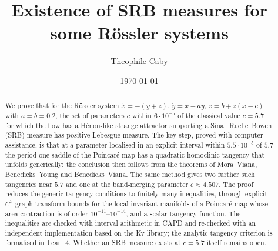 \documentclass[11pt]{amsart}
\theoremstyle{definition}
\theoremstyle{remark}
\begin{document}
\linenumbers

\title[SRB measures for some R\"ossler systems]{Existence of SRB measures for some R\"ossler systems}

\author{Theophile Caby}
\address{Laboratoire d'Oc\'eanographie Physique et Spatiale, Univ Brest, CNRS, Ifremer, IRD, Brest, France}
\makeatletter
{}
\makeatother

\date{\today}


\begin{abstract}
We prove that for the R\"ossler system $\dot x=-(y+z)$, $\dot y=x+ay$, $\dot z=b+z(x-c)$ with $a=b=0.2$, the
set of parameters $c$ within $6\cdot10^{-5}$ of the classical value $c=5.7$ for which the flow has a
H\'enon-like strange attractor supporting a Sinai--Ruelle--Bowen (SRB) measure has positive Lebesgue
measure. The key step, proved with computer assistance, is that at a parameter localised in an explicit interval within
$5.5\cdot10^{-5}$ of $5.7$ the period-one saddle of the Poincar\'e map has a quadratic homoclinic tangency
that unfolds generically; the conclusion then follows from the theorems of Mora--Viana, Benedicks--Young and
Benedicks--Viana. The same method gives two further such tangencies near $5.7$ and one at the band-merging
parameter $c\approx4.507$. The proof reduces the generic-tangency conditions to finitely many inequalities,
through explicit $C^2$ graph-transform bounds for the local invariant manifolds of a Poincar\'e map whose
area contraction is of order $10^{-11}$--$10^{-14}$, and a scalar tangency function. The inequalities are
checked with interval arithmetic in CAPD and re-checked with an independent implementation based on the Kv
library; the analytic tangency criterion is formalised in Lean~4. Whether an SRB measure exists at $c=5.7$
itself remains open.
\end{abstract}
\end{document}

